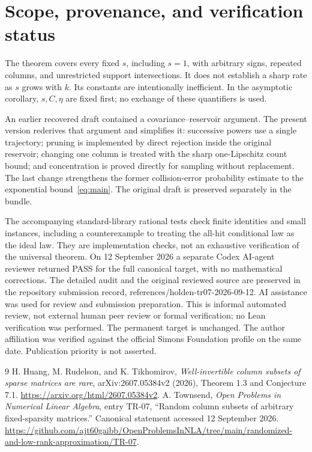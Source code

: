 \documentclass[11pt,a4paper]{article}
\theoremstyle{remark}\newtheorem{remark}[theorem]{Remark}
\begin{document}
\section*{Scope, provenance, and verification status}
The theorem covers every fixed $s$, including $s=1$, with arbitrary signs, repeated columns, and unrestricted support intersections. It does not establish a sharp rate as $s$ grows with $k$. Its constants are intentionally inefficient. In the asymptotic corollary, $s,C,\eta$ are fixed first; no exchange of these quantifiers is used.

An earlier recovered draft contained a covariance--reservoir argument. The present version rederives that argument and simplifies it: successive powers use a single trajectory; pruning is implemented by direct rejection inside the original reservoir; changing one column is treated with the sharp one-Lipschitz count bound; and concentration is proved directly for sampling without replacement. The last change strengthens the former collision-error probability estimate to the exponential bound~\eqref{eq:main}. The original draft is preserved separately in the bundle.

The accompanying standard-library rational tests check finite identities and small instances, including a counterexample to treating the all-hit conditional law as the ideal law. They are implementation checks, not an exhaustive verification of the universal theorem. On 12 September 2026 a separate Codex AI-agent reviewer returned PASS for the full canonical target, with no mathematical corrections. The detailed audit and the original reviewed source are preserved in the repository submission record, references/holden-tr07-2026-09-12. AI assistance was used for review and submission preparation. This is informal automated review, not external human peer review or formal verification; no Lean verification was performed. The permanent target is unchanged. The author affiliation was verified against the official Simons Foundation profile on the same date. Publication priority is not asserted.

\begin{thebibliography}{9}
H. Huang, M. Rudelson, and K. Tikhomirov,
\emph{Well-invertible column subsets of sparse matrices are rare},
arXiv:2607.05384v2 (2026), Theorem 1.3 and Conjecture 7.1.
\url{https://arxiv.org/html/2607.05384v2}.
A. Townsend, \emph{Open Problems in Numerical Linear Algebra}, entry TR-07,
``Random column subsets of arbitrary fixed-sparsity matrices.''
Canonical statement accessed 12 September 2026.
\url{https://github.com/ajt60gaibb/OpenProblemsInNLA/tree/main/randomized-and-low-rank-approximation/TR-07}.
\end{thebibliography}
\end{document}
